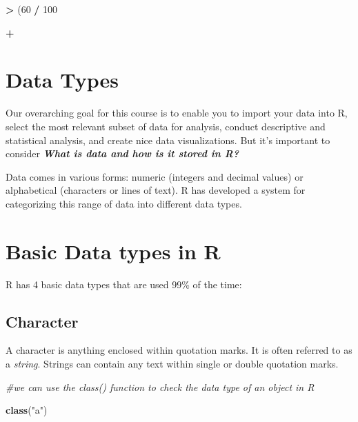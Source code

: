 \documentclass[
]{book}
\newenvironment{Shaded}{\begin{snugshade}}{\end{snugshade}}
\newcommand{\CommentTok}[1]{\textcolor[rgb]{0.56,0.35,0.01}{\textit{#1}}}
\newcommand{\DecValTok}[1]{\textcolor[rgb]{0.00,0.00,0.81}{#1}}
\newcommand{\FunctionTok}[1]{\textcolor[rgb]{0.13,0.29,0.53}{\textbf{#1}}}
\newcommand{\NormalTok}[1]{#1}
\newcommand{\SpecialCharTok}[1]{\textcolor[rgb]{0.81,0.36,0.00}{\textbf{#1}}}
\newcommand{\StringTok}[1]{\textcolor[rgb]{0.31,0.60,0.02}{#1}}
\begin{document}
\begin{Shaded}
\begin{Highlighting}[]
\SpecialCharTok{\textgreater{}}\NormalTok{ (}\DecValTok{60} \SpecialCharTok{/} \DecValTok{100}
   
\SpecialCharTok{+}   
\end{Highlighting}
\end{Shaded}

\hypertarget{data-types}{%
\section{Data Types}\label{data-types}}

Our overarching goal for this course is to enable you to import your data into R, select the most relevant subset of data for analysis, conduct descriptive and statistical analysis, and create nice data visualizations. But it's important to consider \textbf{\emph{What is data and how is it stored in R?}}

Data comes in various forms: numeric (integers and decimal values) or alphabetical (characters or lines of text). R has developed a system for categorizing this range of data into different data types.

\hypertarget{basic-data-types-in-r}{%
\section{Basic Data types in R}\label{basic-data-types-in-r}}

R has 4 basic data types that are used 99\% of the time:

\hypertarget{character}{%
\subsection{Character}\label{character}}

A character is anything enclosed within quotation marks. It is often referred to as a \emph{string}. Strings can contain any text within single or double quotation marks.

\begin{Shaded}
\begin{Highlighting}[]
\CommentTok{\#we can use the class() function to check the data type of an object in R}

\FunctionTok{class}\NormalTok{(}\StringTok{"a"}\NormalTok{)}
\end{Highlighting}
\end{Shaded}
\end{document}

